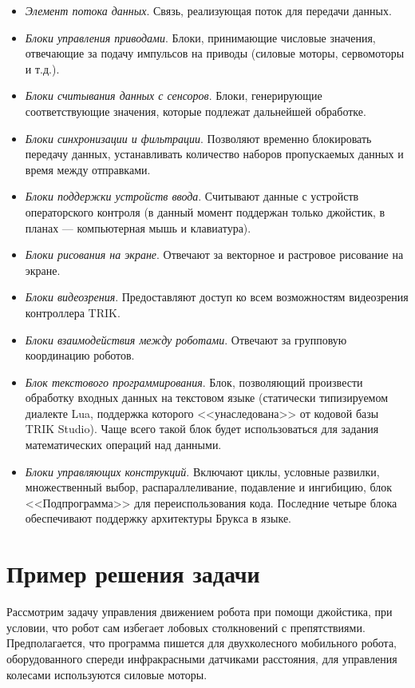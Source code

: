 \documentclass[conference]{IEEEtran}
\begin{document}
\begin{itemize}
\item \textit{Элемент потока данных}. Связь, реализующая поток для передачи данных. 
\item \textit{Блоки управления приводами}. Блоки, принимающие числовые значения, отвечающие за подачу импульсов на приводы (силовые моторы, сервомоторы и т.д.).
\item \textit{Блоки считывания данных с сенсоров}. Блоки, генерирующие соответствующие значения, которые подлежат дальнейшей обработке.
\item \textit{Блоки синхронизации и фильтрации}. Позволяют временно блокировать передачу данных, устанавливать количество наборов пропускаемых данных и время между отправками. 
\item \textit{Блоки поддержки устройств ввода}. Считывают данные с устройств операторского контроля (в данный момент поддержан только джойстик, в планах --- компьютерная мышь и клавиатура). 
\item \textit{Блоки рисования на экране}. Отвечают за векторное и растровое рисование на экране.
\item \textit{Блоки видеозрения}. Предоставляют доступ ко всем возможностям видеозрения контроллера TRIK.
\item \textit{Блоки взаимодействия между роботами}. Отвечают за групповую координацию роботов.
\item \textit{Блок текстового программирования}. Блок, позволяющий произвести обработку входных данных на текстовом языке (статически типизируемом диалекте Lua, поддержка которого <<унаследована>> от кодовой базы TRIK Studio). Чаще всего такой блок будет использоваться для задания математических операций над данными.
\item \textit{Блоки управляющих конструкций}. Включают циклы, условные развилки, множественный выбор, распараллеливание, подавление и ингибицию, блок <<Подпрограмма>> для переиспользования кода. Последние четыре блока обеспечивают поддержку архитектуры Брукса в языке.

\end{itemize} 

\section{Пример решения задачи}
\label{sec:example}
Рассмотрим задачу управления движением робота при помощи джойстика, при условии, что робот сам избегает лобовых столкновений с препятствиями. Предполагается, что программа пишется для двухколесного мобильного робота, оборудованного спереди инфракрасными датчиками расстояния, для управления колесами используются силовые моторы.
\end{document}
